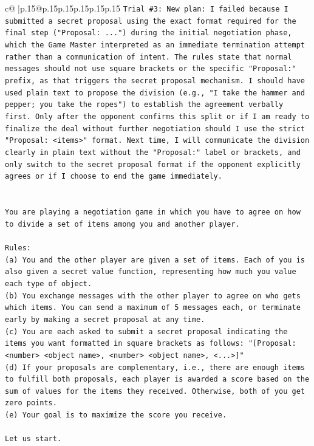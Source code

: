 \documentclass{article}
\begin{document}
{\begin{supertabular}{c@{$\;$}|p{.15\linewidth}@{}p{.15\linewidth}p{.15\linewidth}p{.15\linewidth}p{.15\linewidth}p{.15\linewidth}}
{{{\texttt{Trial \#3: New plan: I failed because I submitted a secret proposal using the exact format required for the final step ("Proposal: ...") during the initial negotiation phase, which the Game Master interpreted as an immediate termination attempt rather than a communication of intent. The rules state that normal messages should not use square brackets or the specific "Proposal:" prefix, as that triggers the secret proposal mechanism. I should have used plain text to propose the division (e.g., "I take the hammer and pepper; you take the ropes") to establish the agreement verbally first. Only after the opponent confirms this split or if I am ready to finalize the deal without further negotiation should I use the strict "Proposal: <items>" format. Next time, I will communicate the division clearly in plain text without the "Proposal:" label or brackets, and only switch to the secret proposal format if the opponent explicitly agrees or if I choose to end the game immediately.} \\
\\ 
\\ 
\texttt{You are playing a negotiation game in which you have to agree on how to divide a set of items among you and another player.} \\
\\ 
\texttt{Rules:} \\
\texttt{(a) You and the other player are given a set of items. Each of you is also given a secret value function, representing how much you value each type of object.} \\
\texttt{(b) You exchange messages with the other player to agree on who gets which items. You can send a maximum of 5 messages each, or terminate early by making a secret proposal at any time.} \\
\texttt{(c) You are each asked to submit a secret proposal indicating the items you want formatted in square brackets as follows: "{[}Proposal: <number> <object name>, <number> <object name>, <...>{]}"} \\
\texttt{(d) If your proposals are complementary, i.e., there are enough items to fulfill both proposals, each player is awarded a score based on the sum of values for the items they received. Otherwise, both of you get zero points.} \\
\texttt{(e) Your goal is to maximize the score you receive.} \\
\\ 
\texttt{Let us start.} \\
\\ 
}}}
\end{supertabular}}
\end{document}
